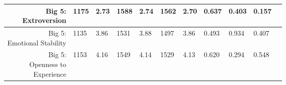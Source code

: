 \begin{longtable}{|r|l|l|l|l|l|l|l|l|l|l}
\hline

	 \makecell{Big 5:\\ Extroversion}                                                & 1175                                                               &  2.73                                                              & 1588                                                               &  2.74                                                              & 1562                                                               &  2.70                                                              & 0.637                                                              & 0.403                                                              & 0.157                                                             \\

\hline

	 \makecell{Big 5:\\ Emotional Stability}                                        & 1135                                                               &  3.86                                                              & 1531                                                               &  3.88                                                              & 1497                                                               &  3.86                                                              & 0.493                                                              & 0.934                                                              & 0.407                                                             \\

\hline

	\makecell{Big 5:\\ Openness to\\ Experience}                                      & 1153                                                               &  4.16                                                              & 1549                                                               &  4.14                                                              & 1529                                                               &  4.13                                                              & 0.620                                                              & 0.294                                                              & 0.548                                                             \\


\end{longtable}
